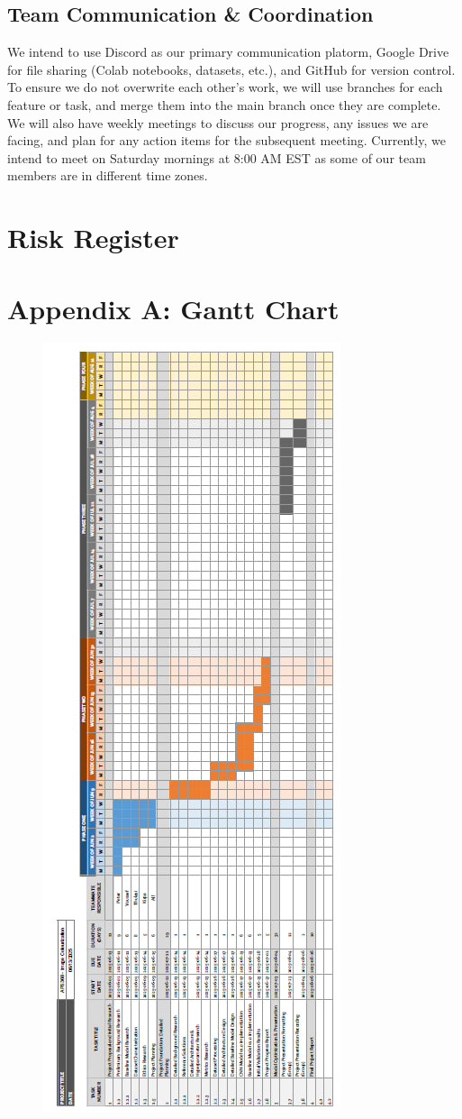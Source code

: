 \documentclass{article} %
\begin{document}
\subsection{Team Communication \& Coordination}

We intend to use Discord as our primary communication platorm, Google Drive for file sharing (Colab notebooks, datasets, etc.), and GitHub for version control. To ensure we do 
not overwrite each other's work, we will use branches for each feature or task, and merge them into the main branch once they are complete. We will also have weekly meetings to
discuss our progress, any issues we are facing, and plan for any action items for the subsequent meeting. Currently, we intend to meet on Saturday mornings at 8:00 AM EST as some
of our team members are in different time zones.

\section{Risk Register}
\label{risk_register}

\label{last_page}




\section{Appendix A: Gantt Chart}
\begin{figure}[htbp]
  \centering
  \includegraphics[width=0.58\linewidth]{Figs/gant-chart-full.jpg}
  \label{fig:gantt_chart}
\end{figure}
\end{document}

